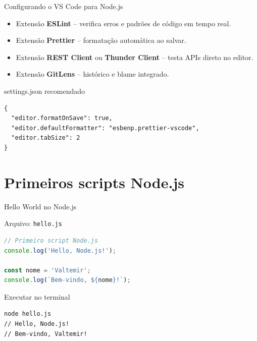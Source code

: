 \documentclass[aspectratio=169]{beamer}
\newcommand{\code}[1]{\texttt{#1}}
\begin{document}
\begin{frame}[fragile]{Configurando o VS Code para Node.js}
\begin{itemize}
  \item Extens\~ao \textbf{ESLint} -- verifica erros e padr\~oes de c\'odigo em tempo real.
  \item Extens\~ao \textbf{Prettier} -- formata\c{c}\~ao autom\'atica ao salvar.
  \item Extens\~ao \textbf{REST Client} ou \textbf{Thunder Client} -- testa APIs direto no editor.
  \item Extens\~ao \textbf{GitLens} -- hist\'orico e blame integrado.
\end{itemize}
\begin{block}{settings.json recomendado}
\begin{lstlisting}
{
  "editor.formatOnSave": true,
  "editor.defaultFormatter": "esbenp.prettier-vscode",
  "editor.tabSize": 2
}
\end{lstlisting}
\end{block}
\end{frame}

\section{Primeiros scripts Node.js}

\begin{frame}[fragile]{Hello World no Node.js}
\begin{block}{Arquivo: \code{hello.js}}
\begin{lstlisting}[language=JavaScript]
// Primeiro script Node.js
console.log('Hello, Node.js!');

const nome = 'Valtemir';
console.log(`Bem-vindo, ${nome}!`);
\end{lstlisting}
\end{block}
\begin{block}{Executar no terminal}
\begin{lstlisting}
node hello.js
// Hello, Node.js!
// Bem-vindo, Valtemir!
\end{lstlisting}
\end{block}
\end{frame}
\end{document}
